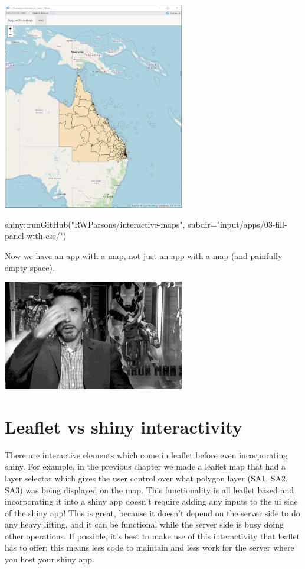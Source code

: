 \documentclass[
]{book}
\newenvironment{Shaded}{\begin{snugshade}}{\end{snugshade}}
\newcommand{\AttributeTok}[1]{\textcolor[rgb]{0.77,0.63,0.00}{#1}}
\newcommand{\FunctionTok}[1]{\textcolor[rgb]{0.00,0.00,0.00}{#1}}
\newcommand{\NormalTok}[1]{#1}
\newcommand{\SpecialCharTok}[1]{\textcolor[rgb]{0.00,0.00,0.00}{#1}}
\newcommand{\StringTok}[1]{\textcolor[rgb]{0.31,0.60,0.02}{#1}}
\begin{document}
\includegraphics[width=3.125in,height=\textheight]{www/app-images/03-fill-panel-with-css.png}

\begin{Shaded}
\begin{Highlighting}[]
\NormalTok{shiny}\SpecialCharTok{::}\FunctionTok{runGitHub}\NormalTok{(}\StringTok{"RWParsons/interactive{-}maps"}\NormalTok{, }\AttributeTok{subdir=}\StringTok{"input/apps/03{-}fill{-}panel{-}with{-}css/"}\NormalTok{)}
\end{Highlighting}
\end{Shaded}

Now we have an app with a map, not just an app with a map (and painfully empty space).

\includegraphics[width=3.125in,height=\textheight]{www/phew.gif}

\hypertarget{leaflet-vs-shiny-interactivity}{%
\section{Leaflet vs shiny interactivity}\label{leaflet-vs-shiny-interactivity}}

There are interactive elements which come in leaflet before even incorporating shiny. For example, in the previous chapter we made a leaflet map that had a layer selector which gives the user control over what polygon layer (SA1, SA2, SA3) was being displayed on the map. This functionality is all leaflet based and incorporating it into a shiny app doesn't require adding any inputs to the ui side of the shiny app! This is great, because it doesn't depend on the server side to do any heavy lifting, and it can be functional while the server side is busy doing other operations. If possible, it's best to make use of this interactivity that leaflet has to offer: this means less code to maintain and less work for the server where you host your shiny app.
\end{document}
